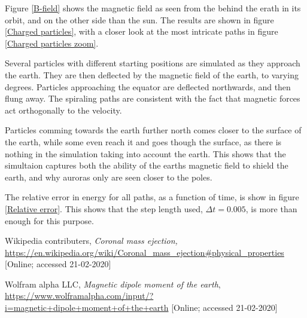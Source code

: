 \documentclass{article}
\begin{document}
    Figure \ref{B-field} shows the magnetic field as seen from the behind the erath in its orbit, and on the other side than the sun. The results are shown in figure \ref{Charged particles}, with a closer look at the most intricate paths in figure \ref{Charged particles zoom}. 
    
    Several particles with different starting positions are simulated as they approach the earth. They are then deflected by the magnetic field of the earth, to varying degrees. Particles approaching the equator are deflected northwards, and then flung away. The spiraling paths are consistent with the fact that magnetic forces act orthogonally to the velocity. 
    
    Particles comming towards the earth further north comes closer to the surface of the earth, while some even reach it and goes though the surface, as there is nothing in the simulation taking into account the earth. This shows that the simultaion captures both the ability of the earths magnetic field to shield the earth, and why auroras only are seen closer to the poles.

    The relative error in energy for all paths, as a function of time, is show in figure \ref{Relative error}. This shows that the step length used, $\Delta t = 0.005$, is more than enough for this purpose.

    \begin{thebibliography}{9}
        Wikipedia contributers,
        \textit{Coronal mass ejection,}
        \url{https://en.wikipedia.org/wiki/Coronal_mass_ejection#physical_properties}
        [Online; accessed 21-02-2020]

        Wolfram alpha LLC,
        \textit{Magnetic dipole moment of the earth},
        \url{https://www.wolframalpha.com/input/?i=magnetic+dipole+moment+of+the+earth}
        [Online; accessed 21-02-2020]
    \end{thebibliography}
\end{document}
